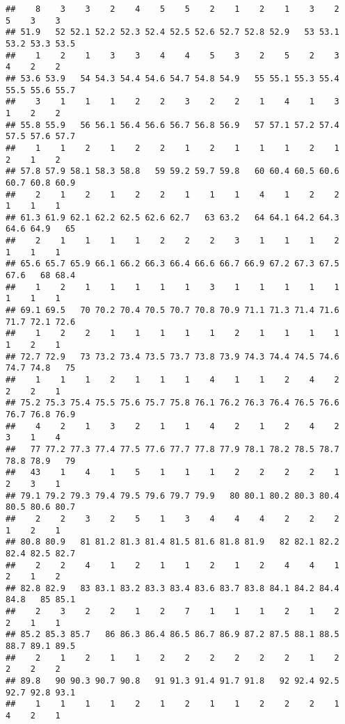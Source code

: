 \documentclass[
]{article}
\begin{document}
\begin{verbatim}
##    8    3    3    2    4    5    5    2    1    2    1    3    2    5    3    3 
## 51.9   52 52.1 52.2 52.3 52.4 52.5 52.6 52.7 52.8 52.9   53 53.1 53.2 53.3 53.5 
##    1    2    1    3    3    4    4    5    3    2    5    2    3    4    2    2 
## 53.6 53.9   54 54.3 54.4 54.6 54.7 54.8 54.9   55 55.1 55.3 55.4 55.5 55.6 55.7 
##    3    1    1    1    2    2    3    2    2    1    4    1    3    1    2    2 
## 55.8 55.9   56 56.1 56.4 56.6 56.7 56.8 56.9   57 57.1 57.2 57.4 57.5 57.6 57.7 
##    1    1    2    1    2    2    1    2    1    1    1    2    1    2    1    2 
## 57.8 57.9 58.1 58.3 58.8   59 59.2 59.7 59.8   60 60.4 60.5 60.6 60.7 60.8 60.9 
##    2    1    2    1    2    2    1    1    1    4    1    2    2    1    1    1 
## 61.3 61.9 62.1 62.2 62.5 62.6 62.7   63 63.2   64 64.1 64.2 64.3 64.6 64.9   65 
##    2    1    1    1    1    2    2    2    3    1    1    1    2    1    1    1 
## 65.6 65.7 65.9 66.1 66.2 66.3 66.4 66.6 66.7 66.9 67.2 67.3 67.5 67.6   68 68.4 
##    1    2    1    1    1    1    1    3    1    1    1    1    1    1    1    1 
## 69.1 69.5   70 70.2 70.4 70.5 70.7 70.8 70.9 71.1 71.3 71.4 71.6 71.7 72.1 72.6 
##    1    2    2    1    1    1    1    1    2    1    1    1    1    1    2    1 
## 72.7 72.9   73 73.2 73.4 73.5 73.7 73.8 73.9 74.3 74.4 74.5 74.6 74.7 74.8   75 
##    1    1    1    2    1    1    1    4    1    1    2    4    2    2    2    1 
## 75.2 75.3 75.4 75.5 75.6 75.7 75.8 76.1 76.2 76.3 76.4 76.5 76.6 76.7 76.8 76.9 
##    4    2    1    3    2    1    1    4    2    1    2    4    2    3    1    4 
##   77 77.2 77.3 77.4 77.5 77.6 77.7 77.8 77.9 78.1 78.2 78.5 78.7 78.8 78.9   79 
##   43    1    4    1    5    1    1    1    2    2    2    2    1    2    3    1 
## 79.1 79.2 79.3 79.4 79.5 79.6 79.7 79.9   80 80.1 80.2 80.3 80.4 80.5 80.6 80.7 
##    2    2    3    2    5    1    3    4    4    4    2    2    2    1    2    1 
## 80.8 80.9   81 81.2 81.3 81.4 81.5 81.6 81.8 81.9   82 82.1 82.2 82.4 82.5 82.7 
##    2    2    4    1    2    1    1    2    1    2    4    4    1    2    1    2 
## 82.8 82.9   83 83.1 83.2 83.3 83.4 83.6 83.7 83.8 84.1 84.2 84.4 84.8   85 85.1 
##    2    3    2    2    1    2    7    1    1    1    2    1    2    2    1    1 
## 85.2 85.3 85.7   86 86.3 86.4 86.5 86.7 86.9 87.2 87.5 88.1 88.5 88.7 89.1 89.5 
##    2    1    2    1    1    2    2    2    2    2    2    1    2    2    2    2 
## 89.8   90 90.3 90.7 90.8   91 91.3 91.4 91.7 91.8   92 92.4 92.5 92.7 92.8 93.1 
##    1    1    1    1    2    1    2    1    1    2    2    2    1    4    2    1 

\end{verbatim}
\end{document}
